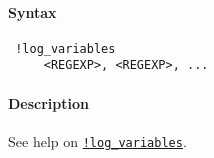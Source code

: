 


	\paragraph{Syntax}
 
 \begin{verbatim}
 !log_variables
     <REGEXP>, <REGEXP>, ...
 \end{verbatim}
 
 \paragraph{Description}
 
 See help on \href{modellang/logvariables}{\texttt{!log\_variables}}.



